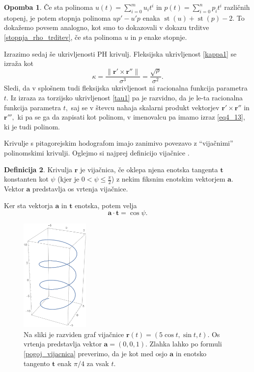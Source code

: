 \documentclass[12pt,a4paper,twoside]{article}
\theoremstyle{definition} %
\newtheorem{definicija}{Definicija}[section]
\newtheorem{opomba}[definicija]{Opomba}
\theoremstyle{plain} %
\theoremstyle{primerstyle}
\numberwithin{equation}{section}  %
\newcommand{\tV}{\mathbf{t}}
\newcommand{\aV}{\mathbf{a}}
\newcommand{\rV}{\mathbf{r}}
\DeclareMathOperator{\st}{st}
\begin{document}
\begin{opomba}
	\label{opomba_proporpoly}
	Če sta polinoma $u(t)=\sum_{i=0}^mu_it^i$ in $p(t)=\sum_{i=0}^np_it^i$ različnih stopenj, je potem stopnja polinoma $up'-u'p$ enaka $\st(u)+\st(p)-2.$ To dokažemo povsem analogno, kot smo to dokazovali v dokazu trditve \ref{stopnja_rho_trditev}, če sta polinoma $u$ in $p$ enake stopnje.  
\end{opomba}

Izrazimo sedaj še ukrivljenosti PH krivulj. Fleksijska ukrivljenost \eqref{kappa1} se izraža kot
\begin{equation}
	\label{kappa2}
	\kappa=\frac{\lVert \rV' \times \rV'' \rVert}{\sigma^3}=\frac{\sqrt{\rho}}{\sigma^2}.
\end{equation}
Sledi, da v splošnem tudi fleksijska ukrivljenost ni racionalna funkcija parametra $t.$ Iz izraza za torzijsko ukrivljenost \eqref{tau1} pa je razvidno, da je le-ta racionalna funkcija parametra $t,$ saj se v števcu nahaja skalarni produkt vektorjev $\rV'\times \rV''$ in $\rV''',$ ki pa se ga da zapisati kot polinom, v imenovalcu pa imamo izraz \eqref{eq4_13}, ki je tudi polinom.

Krivulje s pitagorejskim hodografom imajo zanimivo povezavo z ``vijačnimi'' polinomskimi krivulji. Oglejmo si najprej definicijo vijačnice \cite{kreyszig2019differential}.
\begin{definicija}
	\label{definicija_vijacnica}
	Krivulja $\rV$ je vijačnica, če oklepa njena enotska tangenta $\tV$ konstanten kot $\psi$ (kjer je $0<\psi \leq \frac{\pi}{2}$) z nekim fiksnim enotskim vektorjem $\aV.$ Vektor $\aV$ predstavlja os vrtenja vijačnice.
\end{definicija}
Ker sta vektorja $\aV$ in $\tV$ enotska, potem velja
\begin{equation}
	\label{pogoj_vijacnica}
	\aV \cdot \tV=\cos \psi.
\end{equation}
\begin{figure}[h!]
	  \centering
	  \includegraphics[width=0.3\textwidth]{images/simple_helix.pdf}
	  \caption[Primer preposte vijačnice]{Na sliki je razviden graf vijačnice $\rV(t)=(5\cos{t},\sin{t},t).$ Os vrtenja predstavlja vektor $\aV=(0,0,1).$ Zlahka lahko po formuli \eqref{pogoj_vijacnica} preverimo, da je kot med osjo $\aV$ in enotsko tangento $\tV$ enak $\pi/4$ za vsak $t.$}
	  \label{fig:simple_helix}
	\end{figure}
\end{document}

